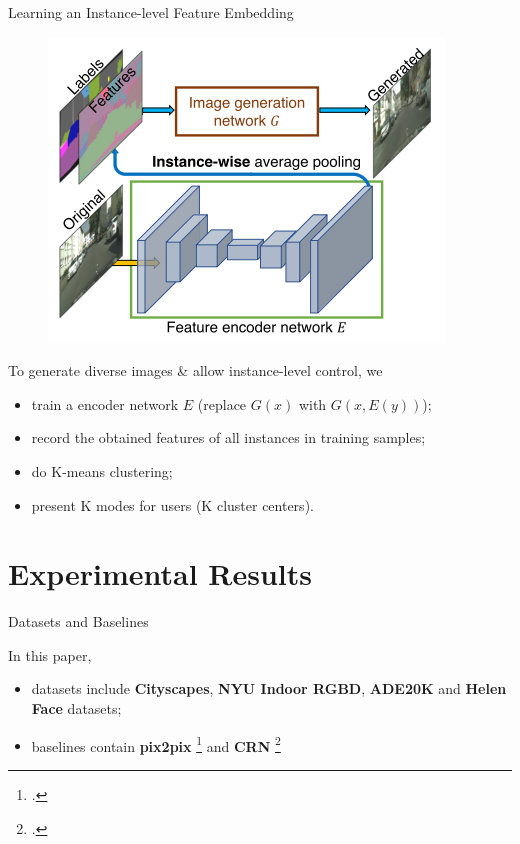 \documentclass{beamer}
\begin{document}
\begin{frame}{Learning an Instance-level Feature Embedding}
\begin{figure}
	\centering
	\includegraphics[height=0.5\textheight]{images/instance}
\end{figure}
%
%
\begin{beamerboxesrounded}[upper=uppercol,lower=lowercol,shadow=false]{To generate diverse images \& allow instance-level control, we}
\begin{itemize}
	\item
	train a encoder network $E$ (replace $G(x)$ with $G(x,E(y))$);
	\item
	record the obtained features of all instances in training samples;
	\item
	do K-means clustering; 
	\item
	present K modes for users (K cluster centers).
	
	\end{itemize}
\end{beamerboxesrounded}
\end{frame}







\section{Experimental Results}
\begin{frame}{Datasets and Baselines}
%
%
\begin{beamerboxesrounded}[upper=uppercol,lower=lowercol,shadow=false]{In this paper, }
	\begin{itemize}
		\item
	datasets include \textbf{Cityscapes}, \textbf{NYU Indoor RGBD}, \textbf{ADE20K} and \textbf{Helen Face} datasets;
		\item
	baselines contain \textbf{pix2pix} \footcite{Image-to-image translation with conditional adversarial networks (CVPR 2017)} and \textbf{CRN} \footcite{Photographic image synthesis with cascaded refinement networks (ICCV 2017)}
	\end{itemize}
\end{beamerboxesrounded}
\end{frame}
\end{document}
